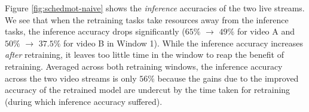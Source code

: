 Figure \ref{fig:schedmot-naive} shows the {\em inference} accuracies of the two live streams.
We see that when the retraining tasks take resources away from the inference tasks, the inference accuracy drops significantly ({$65\%$} $\rightarrow$ {$49\%$} for video A and {$50\%$} $\rightarrow$ {$37.5\%$} for video B in Window 1).
While the inference accuracy increases \emph{after} retraining, it leaves too little time in the window to reap the benefit of retraining. 
Averaged across both retraining windows, the inference accuracy across the two video streams is only $56\%$ because the gains due to the improved accuracy of the retrained model are undercut by the time taken for retraining (during which inference accuracy suffered).










